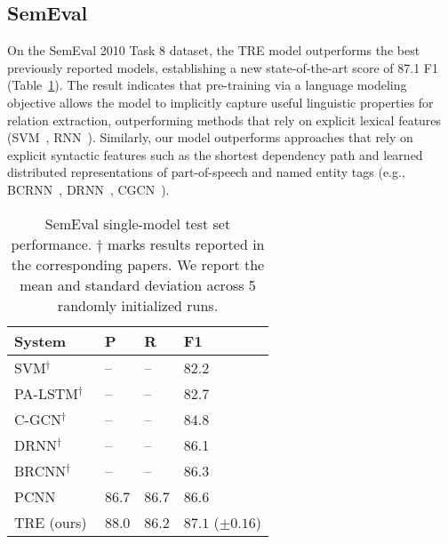 \documentclass[akbc,twoside,11pt]{article}
\begin{document}
\subsection{SemEval}
\label{subsec:res_semeval}
On the SemEval 2010 Task 8 dataset, the TRE model outperforms the best previously reported models, establishing a new state-of-the-art score of 87.1 F1 (Table~\ref{tab:results_semeval2}).
The result indicates that pre-training via a language modeling objective allows the model to implicitly capture useful linguistic properties for relation extraction, outperforming methods that rely on explicit lexical features (SVM~\cite{rink_semrel_2010}, RNN~\cite{zhang_relationcv_2015}). Similarly, our model outperforms approaches that rely on explicit syntactic features such as the shortest dependency path and learned distributed representations of part-of-speech and named entity tags (e.g., BCRNN~\cite{cai_bidirectionalrc_2016}, DRNN~\cite{xu_improvedrc_2016}, CGCN~\cite{zhang_graphco_2018}).
\begin{table}[ht!]
\centering
\begin{tabular}{l l l l}
\hline
System & P & R & F1 \\\hline
SVM{$^\mathrm{\dagger}$}~\citet{rink_semrel_2010} & -- & -- & 82.2\\
PA-LSTM{$^\mathrm{\dagger}$}~\citet{zhang_graphco_2018} & -- & -- & 82.7 \\
C-GCN{$^\mathrm{\dagger}$}~\citet{zhang_graphco_2018} & -- & -- & 84.8 \\
DRNN{$^\mathrm{\dagger}$}~\citet{xu_improvedrc_2016} & -- & -- & 86.1 \\
BRCNN{$^\mathrm{\dagger}$}~\citet{cai_bidirectionalrc_2016} & -- & -- & 86.3 \\
PCNN~\citet{zeng_distant_2015} & 86.7 & 86.7 & 86.6\\
TRE (ours) & 88.0 & 86.2 & $\mathbf{87.1}$ ($\pm 0.16$)\\\hline
\end{tabular}
\caption{SemEval single-model test set performance. $\mathrm{\dagger}$ marks results reported in the corresponding papers. We report the mean and standard deviation across 5 randomly initialized runs.}
    \label{tab:results_semeval2}
\end{table}
\end{document}
